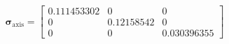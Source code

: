 $$
\boldsymbol\sigma_{\mathrm{axis}} = \left[\begin{matrix}0.111453302 & 0 & 0\\0 & 0.12158542 & 0\\0 & 0 & 0.030396355\end{matrix}\right]
$$
